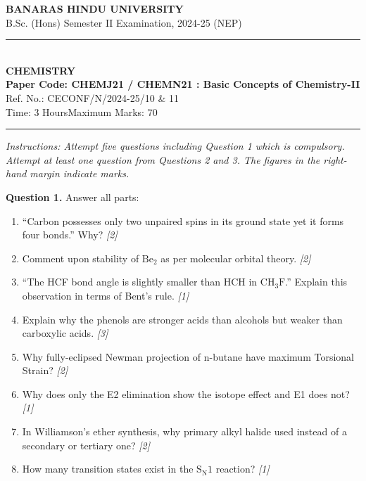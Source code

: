 \documentclass[11pt,a4paper]{article}
\newcommand{\pts}[1]{\hfill \textit{[#1]}}
\begin{document}
\begin{center}
  {\large\bfseries BANARAS HINDU UNIVERSITY}\\[2pt]
  {\normalsize B.Sc. (Hons) Semester II Examination, 2024-25 (NEP)}\\[6pt]
  \rule{0.8\linewidth}{0.5pt}\\[6pt]
  {\large\bfseries CHEMISTRY}\\[4pt]
  {\large\bfseries Paper Code: CHEMJ21 / CHEMN21 : Basic Concepts of Chemistry-II}\\[2pt]
  {\small Ref. No.: CECONF/N/2024-25/10 \& 11}\\[4pt]
  {\normalsize Time: 3 Hours\hfill Maximum Marks: 70}
\end{center}

\rule{\linewidth}{0.4pt}

\smallskip

\noindent \textit{Instructions: Attempt five questions including Question 1 which is compulsory. Attempt at least one question from Questions 2 and 3. The figures in the right-hand margin indicate marks.}

\bigskip

\noindent \textbf{Question 1.} Answer all parts:
\begin{enumerate}[label=(\alph*)]
  \item ``Carbon possesses only two unpaired spins in its ground state yet it forms four bonds.'' Why? \pts{2}
  \item Comment upon stability of $\text{Be}_2$ as per molecular orbital theory. \pts{2}
  \item ``The HCF bond angle is slightly smaller than HCH in $\text{CH}_3\text{F}$.'' Explain this observation in terms of Bent's rule. \pts{1}
  \item Explain why the phenols are stronger acids than alcohols but weaker than carboxylic acids. \pts{3}
  \item Why fully-eclipsed Newman projection of n-butane have maximum Torsional Strain? \pts{2}
  \item Why does only the E2 elimination show the isotope effect and E1 does not? \pts{1}
  \item In Williamson's ether synthesis, why primary alkyl halide used instead of a secondary or tertiary one? \pts{2}
  \item How many transition states exist in the $\text{S}_\text{N}1$ reaction? \pts{1}
\end{enumerate}

\bigskip
\end{document}
